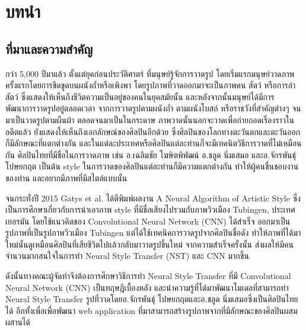 \documentclass[12pt,oneside,openright,a4paper]{cpe-thai-project}
\begin{document}



\chapter{บทนำ}






\section{ที่มาและความสำคัญ}

\par\setlength{\parindent}{5ex}กว่า 5,000 ปีมาแล้ว ตั้งแต่ยุคก่อนประวัติศาตร์ ที่มนุษย์รู้จักการวาดรูป โดยเริ่มแรกมนุษย์วาดภาพครั้งแรกโดยการขีดขูดบนผนังถ้ำหรือเพิงพา โดยรูปภาพที่วาดออกมาจะเป็นภาพคน สัตว์ หรือการล่าสัตว์ ซึ่งแสดงให้เห็นถึงชีวิตความเป็นอยู่ของคนในยุคสมัยนั้น และหลังจากนั้นมนุษย์ได้มีการพัฒนาการวาดรูปอยู่ตลอดเวลา จากการวาดรูปตามผนังถ้ำ ตามผนังโบสถ์ หรือราชวังที่สำคัญต่างๆ จนมาเป็นวาดรูปตามผืนผ้า ตลอดจนมาเป็นในกระดาษ ภาพวาดนั้นนอกจะวาดเพื่อถ่ายถอดเรื่องราวในอดีตแล้ว ยังแสดงให้เห็นถึงเอกลักษณ์ของศิลปินอีกด้วย ซึ่งศิลปินของโลกทางตะวันตกและตะวันออกก็มีลักษณะที่แตกต่างกัน และในแต่ละประเทศหรือศิลปินแต่ละท่านก็จะมีเทคนิตวิธีการวาดที่ไม่เหมือนกัน ศิลปินไทยที่มีชื่อในการวาดภาพ เช่น อ.เฉลิมชัย โฆษิตพิพัฒน์ อ.ชลูด นิ่มเสมอ และอ.จักรพันธุ์ โปษยกฤต เป็นต้น style ในการวาดของศิลปินแต่ละท่านก็มีความแตกต่างกัน ทำให้ผู้คนชื่นชอบงานของท่าน และอยากมีภาพที่มีสไตล์แบบนั้น 
\par\setlength{\parindent}{5ex}จนกระทั่งปี 2015 Gatys et al. ได้ตีพิมพ์ผลงาน A Neural Algorithm of Artistic Style ซึ่งเป็นการศึกษาเกี่ยวกับการนำเอาภาพ style ที่มีชื่อเสียงไปรวมกับภาพวิวเมือง Tubingen, ประเทศเยอรมัน โดยใช้แนวคิดของ Convolutional Neural Network (CNN)  ได้สำเร็จ ออกมาเป็นรูปภาพที่เป็นรูปภาพวิวเมือง Tubingen แต่ได้ใช้เทคนิคการวาดรูปจากศิลปินชื่อดัง ทำให้ภาพที่ได้มาใหม่นั้นดูเหมือนศิลปินที่เสียชีวิตไปแล้วกลับมาวาดรูปขึ้นใหม่ จากความสำเร็จครั้งนั้น ส่งผลให้มีคนจำนวนมากสนใจในการทำ Neural Style Transfer (NST) และ CNN มากขึ้น
\par\setlength{\parindent}{5ex}ดังนั้นทางคณะผู้จัดทำจึงต้องการศึกษาวิธีการทำ Neural Style Transfer ที่มี Convolutional Neural Network (CNN) เป็นทฤษฎีเบื้องหลัง และนำความรู้ที่ได้มาพัฒนาโมเดลที่สามารถทำ Neural Style Transfer รูปที่วาดโดยอ.จักรพันธุ์ โปษยกฤตและอ.ชลูด นิ่มเสมอซึ่งเป็นศิลปินไทยได้ อีกทั้งเพื่อเพื่อพัฒนา web application ที่มาสามารถสร้างรูปภาพจากที่มีลักษณะของศิลปินผสมผสานได้
\end{document}

